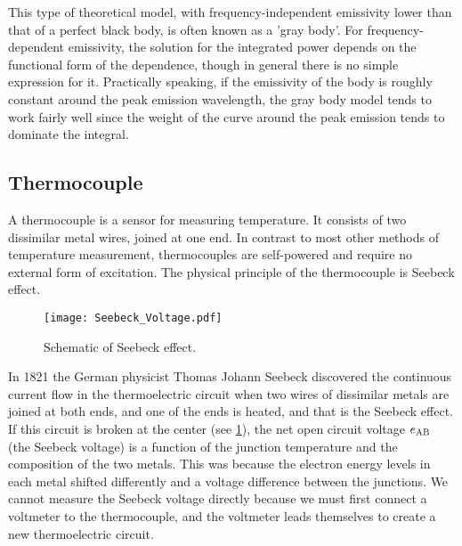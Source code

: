 This type of theoretical model, with frequency-independent emissivity lower than that of a perfect black body, is often known as a 'gray body'. For frequency-dependent emissivity, the solution for the integrated power depends on the functional form of the dependence, though in general there is no simple expression for it. Practically speaking, if the emissivity of the body is roughly constant around the peak emission wavelength, the gray body model tends to work fairly well since the weight of the curve around the peak emission tends to dominate the integral.

\subsection{Thermocouple}
\noindent
A thermocouple is a sensor for measuring temperature.
It consists of two dissimilar metal wires, joined at one end.
In contrast to most other methods of temperature measurement, thermocouples are self-powered and require no external form of excitation.
The physical principle of the thermocouple is Seebeck effect.

\begin{figure}[!htp]
	\centering
	\texttt{[image: Seebeck\_Voltage.pdf]}
	\caption{Schematic of Seebeck effect.}
	\label{Fig:Seebeck_Voltage}
\end{figure}
In 1821 the German physicist Thomas Johann Seebeck discovered the continuous current flow in the thermoelectric circuit when two wires of dissimilar metals are joined at both ends, and one of the ends is heated, and that is the Seebeck effect.
If this circuit is broken at the center (see \ref{Fig:Seebeck_Voltage}), the net open circuit voltage $e_{\rm AB}$ (the Seebeck voltage) is a function of the junction temperature and the composition of the two metals.
This was because the electron energy levels in each metal shifted differently and a voltage difference between the junctions.
We cannot measure the Seebeck voltage directly because we must first connect a voltmeter to the thermocouple, and the voltmeter leads themselves to create a new thermoelectric circuit.

